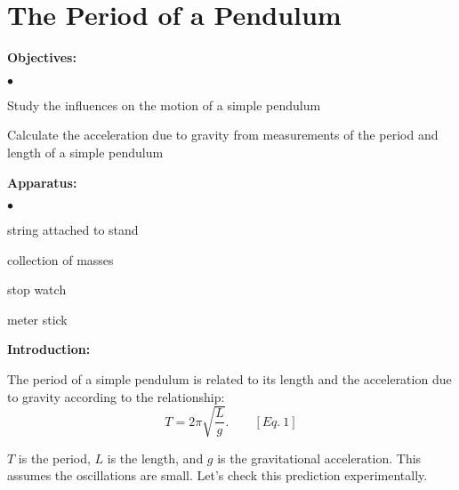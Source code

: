 
\section{The Period of a Pendulum}

\makelabheader %

{\noindent \bf Objectives:} \begin{list}{$\bullet$}{\itemsep0pt }

\item Study the influences on the motion of a simple pendulum \item Calculate the acceleration due to gravity from measurements of the period and length of a simple pendulum
\end{list}

{\noindent \bf Apparatus:} \begin{list}{$\bullet$}{\itemsep0pt }

\item string attached to stand \item collection of masses \item stop watch \item meter stick

\end{list}

{\noindent \bf Introduction:}

\noindent The period of a simple pendulum is related to its length and the acceleration due to gravity according to the relationship:
\[
T=2\pi \sqrt{\frac{L}{g}}.\qquad [Eq.\: 1]\]

\noindent $T$ is the period, $L$ is the length, and $g$ is the gravitational acceleration. This assumes the oscillations are small. Let's check this prediction experimentally. 

